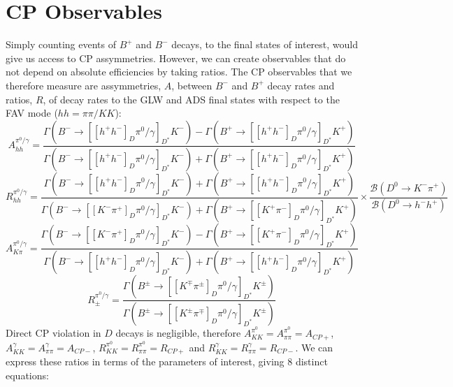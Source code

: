 \documentclass[oneside,12pt]{article}
\begin{document}
\section{\normalsize CP Observables}
Simply counting events of $B^{+}$ and $B^{-}$ decays, to the final states of interest, would give us access to CP assymmetries. However, we can create observables that do not depend on absolute efficiencies by taking ratios. The CP observables that we therefore measure are assymmetries, $A$, between $B^{-}$ and $B^{+}$ decay rates and ratios, $R$, of decay rates to the GLW and ADS final states with respect to the FAV mode ($hh=\pi \pi /KK$):
  \begin{equation}
		A_{hh}^{\pi^{0}/\gamma}=\frac{\Gamma(B^{-}\rightarrow [[h^{+}h^{-}]_{D}\pi^{0}/\gamma]_{D^{*}}K^{-})-\Gamma(B^{+}\rightarrow [[h^{+}h^{-}]_{D}\pi^{0}/\gamma]_{D^{*}}K^{+})}{\Gamma(B^{-}\rightarrow [[h^{+}h^{-}]_{D}\pi^{0}/\gamma]_{D^{*}}K^{-})+\Gamma(B^{+}\rightarrow [[h^{+}h^{-}]_{D}\pi^{0}/\gamma]_{D^{*}}K^{+})}
    \label{eq:Aglw}
  \end{equation}
  \begin{equation}
		R_{hh}^{\pi^{0}/\gamma}=\frac{\Gamma(B^{-}\rightarrow [[h^{+}h^{-}]_{D}\pi^{0}/\gamma]_{D^{*}}K^{-})+\Gamma(B^{+}\rightarrow [[h^{+}h^{-}]_{D}\pi^{0}/\gamma]_{D^{*}}K^{+})}{\Gamma(B^{-}\rightarrow [[K^{-}\pi^{+}]_{D}\pi^{0}/\gamma]_{D^{*}}K^{-})+\Gamma(B^{+}\rightarrow [[K^{+}\pi^{-}]_{D}\pi^{0}/\gamma]_{D^{*}}K^{+})} \times \frac{\mathcal{B}(D^{0}\rightarrow K^{-}\pi^{+})}{\mathcal{B}(D^{0}\rightarrow h^{-}h^{+})}
    \label{eq:Rglw}
  \end{equation}
  \begin{equation}
		A_{K\pi}^{\pi^{0}/\gamma}=\frac{\Gamma(B^{-}\rightarrow [[K^{-}\pi^{+}]_{D}\pi^{0}/\gamma]_{D^{*}}K^{-})-\Gamma(B^{+}\rightarrow [[K^{+}\pi^{-}]_{D}\pi^{0}/\gamma]_{D^{*}}K^{+})}{\Gamma(B^{-}\rightarrow [[h^{+}h^{-}]_{D}\pi^{0}/\gamma]_{D^{*}}K^{-})+\Gamma(B^{+}\rightarrow [[h^{+}h^{-}]_{D}\pi^{0}/\gamma]_{D^{*}}K^{+})}
    \label{eq:Afav}
  \end{equation}
  \begin{equation}
		R_{\pm}^{\pi^{0}/\gamma}=\frac{\Gamma(B^{\pm}\rightarrow [[K^{\mp}\pi^{\pm}]_{D}\pi^{0}/\gamma]_{D^{*}}K^{\pm})}{\Gamma(B^{\pm}\rightarrow [[K^{\pm}\pi^{\mp}]_{D}\pi^{0}/\gamma]_{D^{*}}K^{\pm})}
    \label{eq:Rads}
  \end{equation}
\noindent Direct CP violation in $D$ decays is negligible, therefore $A_{KK}^{\pi^{0}}=A_{\pi\pi}^{\pi^{0}}=A_{CP+}$, $A_{KK}^{\gamma}=A_{\pi\pi}^{\gamma}=A_{CP-}$, $R_{KK}^{\pi^{0}}=R_{\pi\pi}^{\pi^{0}}=R_{CP+}$ and $R_{KK}^{\gamma}=R_{\pi\pi}^{\gamma}=R_{CP-}$. We can express these ratios in terms of the parameters of interest, giving 8 distinct equations: 
\end{document}
